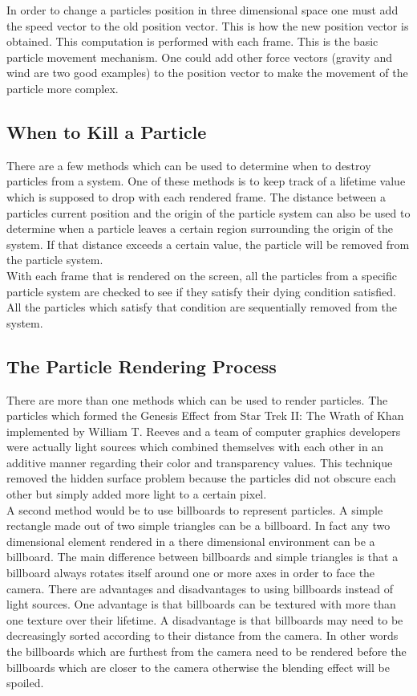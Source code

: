 In order to change a particles position in three dimensional space one must add the speed vector to the old position vector. This is how the new position vector is obtained. This computation is performed with each frame. This is the basic particle movement mechanism. One could add other force vectors (gravity and wind are two good examples) to the position vector to make the movement of the particle more complex.\\

\newpage
\subsection{When to Kill a Particle}
There are a few methods which can be used to determine when to destroy particles from a system. One of these methods is to keep track of a lifetime value which is supposed to drop with each rendered frame. The distance between a particles current position and the origin of the particle system can also be used to determine when a particle leaves a certain region surrounding the origin of the system. If that distance exceeds a certain value, the particle will be removed from the particle system.\\

With each frame that is rendered on the screen, all the particles from a specific particle system are checked to see if they satisfy their dying condition satisfied. All the particles which satisfy that condition are sequentially removed from the system.

\newpage
\subsection{The Particle Rendering Process}
There are more than one methods which can be used to render particles. The particles which formed the Genesis Effect from Star Trek II: The Wrath of Khan implemented by William T. Reeves and a team of computer graphics developers were actually light sources which combined themselves with each other in an additive manner regarding their color and transparency values. This technique removed the hidden surface problem because the particles did not obscure each other but simply added more light to a certain pixel.\\

A second method would be to use billboards to represent particles. A simple rectangle made out of two simple triangles can be a billboard. In fact any two dimensional element rendered in a there dimensional environment can be a billboard. The main difference between billboards and simple triangles is that a billboard always rotates itself around one or more axes in order to face the camera. There are advantages and disadvantages to using billboards instead of light sources. One advantage is that billboards can be textured with more than one texture over their lifetime. A disadvantage is that billboards may need to be decreasingly sorted according to their distance from the camera. In other words the billboards which are furthest from the camera need to be rendered before the billboards which are closer to the camera otherwise the blending effect will be spoiled.\\